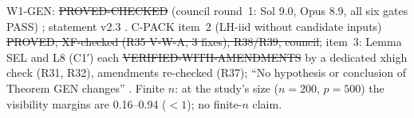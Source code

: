 \begin{statusbox}
W1-GEN: \st{PROVED-CHECKED} (council round~1: Sol 9.0, Opus 8.9, all six gates PASS) ; statement v2.3 . C-PACK item~2 (LH-iid without candidate inputs) \st{PROVED; XF-checked (R35 V-W-A, 3 fixes), R38/R39, council}; item~3: Lemma SEL and L8 (C1′) each \st{VERIFIED-WITH-AMENDMENTS} by a dedicated xhigh check (R31, R32), amendments re-checked (R37); ``No hypothesis or conclusion of Theorem GEN changes'' . Finite $n$: at the study's size ($n=200$, $p=500$) the visibility margins are 0.16--0.94 ($<1$); no finite-$n$ claim.
\end{statusbox}

